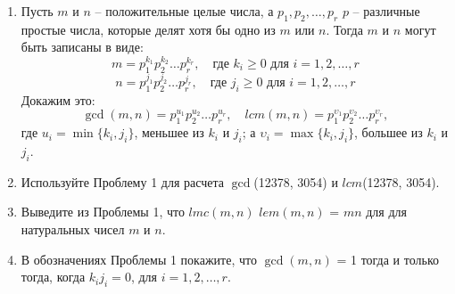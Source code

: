 \documentclass[11pt]{article}
\begin{document}
	\begin{enumerate}
		\item Пусть $m$ и $n$ -- положительные целые числа, а $p_{1},p_{2},\ldots,p_{r}$ $p$ -- различные простые числа, которые делят хотя бы одно из $m$ или $n$. Тогда $m$ и $n$ могут быть записаны в виде:
		\[{m = p_{1}^{k_{1}}p_{2}^{k_{2}}\ldots p_{r}^{k_{r}},\quad \text{где } k_{i}\ge0 \text{ для } i = 1,2,\ldots,r}\]
		\[{n = p_{1}^{j_{1}}p_{2}^{j_{2}}\ldots p_{r}^{j_{r}},\quad \text{где } j_{i}\ge0 \text{ для } i = 1,2,\ldots,r}\]
		Докажим это:
		\[{\gcd (m,n) = p_{1}^{u_{1}}p_{2}^{u_{2}}\ldots p_{r}^{u_{r}},\quad lcm(m,n) = p_{1}^{\upsilon_{1}}p_{2}^{\upsilon_{2}}\ldots p_{r}^{\upsilon_{r}}},\]
		где $u_{i} = \min \{k_{i},j_{i}\}$, меньшее из $ k_{i} $ и $ j_{i} $; а $\upsilon_{i} = \max \{k_{i},j_{i}\}$, большее из $ k_{i} $ и $ j_{i} $.
		
		\item Используйте Проблему 1 для расчета $\gcd$(12378, 3054) и $lcm$(12378, 3054).
		
		\item Выведите из Проблемы 1, что $lmc(m, n)$ $lem(m, n)$ = $mn$ для для натуральных чисел $m$ и $n$.
		
		\item В обозначениях Проблемы 1 покажите, что $\gcd(m, n)$ = 1 тогда и только тогда, когда $k_{i}j_{i} = 0$, для $i = 1,2,\ldots,r$.
		

\end{enumerate}
\end{document}
